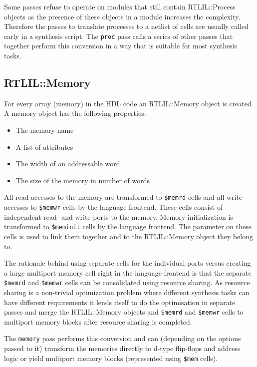 Some passes refuse to operate on modules that still contain RTLIL::Process objects as the
presence of these objects in a module increases the complexity. Therefore the passes to translate
processes to a netlist of cells are usually called early in a synthesis script. The {\tt proc}
pass calls a series of other passes that together perform this conversion in a way that is suitable
for most synthesis tasks.

\subsection{RTLIL::Memory}

For every array (memory) in the HDL code an RTLIL::Memory object is created. A
memory object has the following properties:

\begin{itemize}
\item The memory name
\item A list of attributes
\item The width of an addressable word
\item The size of the memory in number of words
\end{itemize}

All read accesses to the memory are transformed to {\tt \$memrd} cells and all write accesses to
{\tt \$memwr} cells by the language frontend. These cells consist of independent read- and write-ports
to the memory. Memory initialization is transformed to {\tt \$meminit} cells by the language frontend.
The  parameter on these cells is used to link them together and to the RTLIL::Memory object they belong to.

The rationale behind using separate cells for the individual ports versus
creating a large multiport memory cell right in the language frontend is that
the separate {\tt \$memrd} and {\tt \$memwr} cells can be consolidated using resource sharing.
As resource sharing is a non-trivial optimization problem where different synthesis tasks
can have different requirements it lends itself to do the optimisation in separate passes and merge
the RTLIL::Memory objects and {\tt \$memrd} and {\tt \$memwr} cells to multiport memory blocks after resource sharing is completed.

The {\tt memory} pass performs this conversion and can (depending on the options passed
to it) transform the memories directly to d-type flip-flops and address logic or yield
multiport memory blocks (represented using {\tt \$mem} cells).

